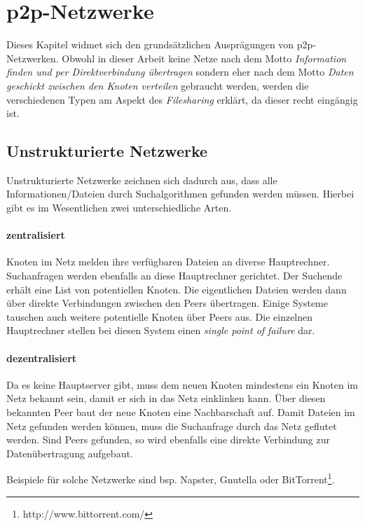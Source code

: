 
\section{p2p-Netzwerke}
Dieses Kapitel widmet sich den grundsätzlichen Ausprägungen von p2p-Netzwerken. Obwohl in dieser Arbeit keine Netze nach dem Motto \emph{Information finden und per Direktverbindung übertragen} sondern eher nach dem Motto \emph{Daten geschickt zwischen den Knoten verteilen} gebraucht werden, werden die verschiedenen Typen am Aspekt des \emph{Filesharing} erklärt, da dieser recht eingängig ist.


\subsection{Unstrukturierte Netzwerke}
Unstrukturierte Netzwerke zeichnen sich dadurch aus, dass alle Informationen/Dateien durch Suchalgorithmen gefunden werden müssen. Hierbei gibt es im Wesentlichen zwei unterschiedliche Arten.

\paragraph{zentralisiert} Knoten im Netz melden ihre verfügbaren Dateien an diverse Hauptrechner. Suchanfragen werden ebenfalls an diese Hauptrechner gerichtet. Der Suchende erhält eine List von potentiellen Knoten. Die eigentlichen Dateien werden dann über direkte Verbindungen zwischen den Peers übertragen. Einige Systeme tauschen auch weitere potentielle Knoten über Peers aus. Die einzelnen Hauptrechner stellen bei diesen System einen \emph{single point of failure} dar.

\paragraph{dezentralisiert} Da es keine Hauptserver gibt, muss dem neuen Knoten mindestens ein Knoten im Netz bekannt sein, damit er sich in das Netz einklinken kann. Über diesen bekannten Peer baut der neue Knoten eine Nachbarschaft auf. Damit Dateien im Netz gefunden werden können, muss die Suchanfrage durch das Netz geflutet werden. Sind Peers gefunden, so wird ebenfalls eine direkte Verbindung zur Datenübertragung aufgebaut.

Beispiele für solche Netzwerke sind bsp. Napster, Gnutella oder BitTorrent\footnote{http://www.bittorrent.com/}.


